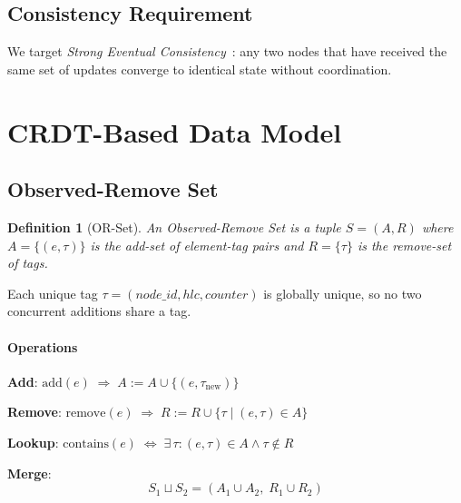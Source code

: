 \documentclass[conference]{IEEEtran}
\newtheorem{definition}{Definition}
\begin{document}
\subsection{Consistency Requirement}
We target \emph{Strong Eventual Consistency}~\cite{shapiro_crdt_2011}: any two
nodes that have received the same set of updates converge to identical state
without coordination.

\section{CRDT-Based Data Model}
\label{sec:crdt}

\subsection{Observed-Remove Set}
\begin{definition}[OR-Set]
An \emph{Observed-Remove Set} is a tuple $S=(A,R)$ where $A=\{(e,\tau)\}$ is
the add-set of element-tag pairs and $R=\{\tau\}$ is the remove-set of tags.
\end{definition}
Each unique tag $\tau=(\mathit{node\_id},\mathit{hlc},\mathit{counter})$ is
globally unique, so no two concurrent additions share a tag.

\paragraph{Operations}
\textbf{Add}: $\mathrm{add}(e)\;\Rightarrow\; A:=A\cup\{(e,\tau_\mathrm{new})\}$

\textbf{Remove}: $\mathrm{remove}(e)\;\Rightarrow\; R:=R\cup\{\tau\mid(e,\tau)\in A\}$

\textbf{Lookup}: $\mathrm{contains}(e)\;\Leftrightarrow\;
\exists\,\tau\colon(e,\tau)\in A\land\tau\notin R$

\textbf{Merge}:
\begin{equation}\label{eq:merge}
  S_1\sqcup S_2 = (A_1\cup A_2,\; R_1\cup R_2)
\end{equation}
\end{document}
